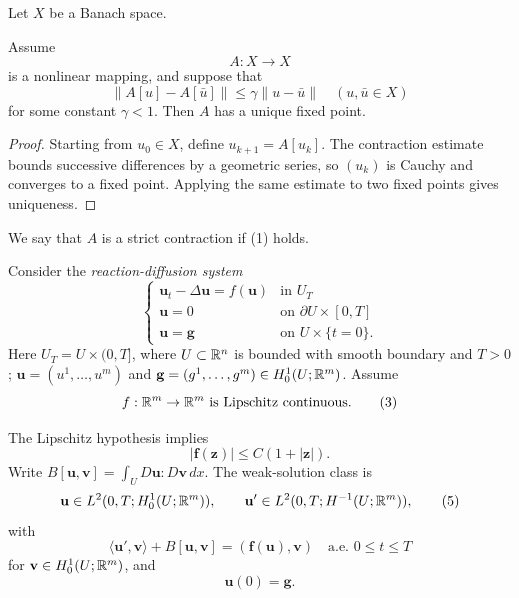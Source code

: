 Let $X$ be a Banach space.

\begin{theorem}
\label{thm:banach-fixed-point-theorem}
Assume
\[
A : X \to X
\]
is a nonlinear mapping, and suppose that
\[
\|A[u] - A[\bar{u}]\| \leq \gamma \|u - \bar{u}\| \quad (u, \bar{u} \in X)
\tag{1}
\]
for some constant $\gamma < 1$. Then $A$ has a unique fixed point.
\end{theorem}

\begin{proof}
\sketch Starting from $u_0\in X$, define $u_{k+1}=A[u_k]$. The contraction estimate bounds successive differences by a geometric series, so $(u_k)$ is Cauchy and converges to a fixed point. Applying the same estimate to two fixed points gives uniqueness.
\end{proof}

\begin{definition}
\label{def:strict-contraction}
We say that $A$ is a strict contraction if (1) holds.
\end{definition}

\begin{example}
\label{ex:reaction-diffusion-banach-fixed-point}

Consider the \textit{reaction-diffusion system}
\[
\begin{cases}
\mathbf{u}_t - \Delta \mathbf{u} = f(\mathbf{u}) & \text{in } U_T \\
\mathbf{u} = 0 & \text{on } \partial U \times [0,T] \\
\mathbf{u} = \mathbf{g} & \text{on } U \times \{t = 0\}.
\end{cases}
\tag{2}
\]
Here $U_T=U\times(0,T]$, where $U\subset\mathbb{R}^n$ is bounded with smooth boundary and $T>0$; $\mathbf u=(u^1,\ldots,u^m)$ and $\mathbf g=(g^1,\ldots,g^m)\in H_0^1(U;\mathbb{R}^m)$. Assume
\[
f : \mathbb{R}^m \to \mathbb{R}^m \text{ is Lipschitz continuous.}
\tag{3}
\]
\end{example}

The Lipschitz hypothesis implies
\[
|\mathbf f(\mathbf z)|\leq C(1+|\mathbf z|).
\tag{4}
\]
Write $B[\mathbf u,\mathbf v]=\int_U D\mathbf u:D\mathbf v\,dx$. The weak-solution class is
\[
\mathbf u\in L^2(0,T;H_0^1(U;\mathbb{R}^m)),
\qquad
\mathbf u'\in L^2(0,T;H^{-1}(U;\mathbb{R}^m)),
\tag{5}
\]
with
\[
\langle\mathbf u',\mathbf v\rangle+B[\mathbf u,\mathbf v]
=(\mathbf f(\mathbf u),\mathbf v)
\quad\text{a.e. }0\leq t\leq T
\tag{6}
\]
for $\mathbf v\in H_0^1(U;\mathbb{R}^m)$, and
\[
\mathbf u(0)=\mathbf g.
\tag{7}
\]

